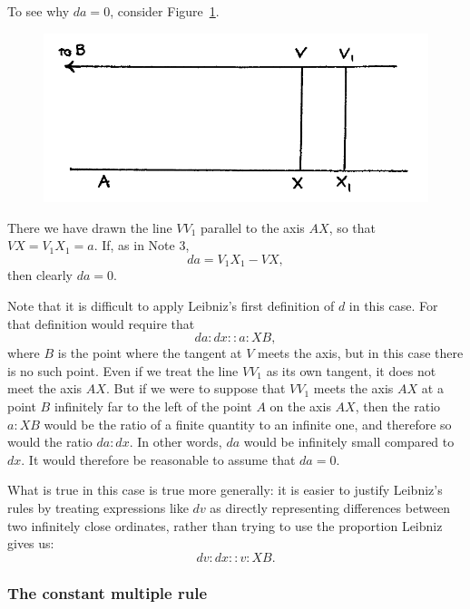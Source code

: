 \documentclass[twoside,openright]{article}
\begin{document}
To see why $da =0$, consider Figure~\ref{conrule}.
\begin{figure}[htp]
\begin{center}
\includegraphics[width=.75\textwidth]{fig/Figure12}
\caption{}
\label{conrule}
\vspace{-10pt}
\end{center}
\end{figure}
  There we have drawn the line $VV_1$ parallel to the axis $AX$, so that $VX =V_1X_1 = a$.   If, as in Note 3,
$$ da = V_1X_1 - VX,$$
then clearly $da =0$.

Note that it is difficult to apply Leibniz's first definition of $d$
in this case.  For that definition would require that
$$da \!:\! dx :: a \!:\! XB,$$ 
where $B$ is the point where the tangent at $V$ meets the axis, but in
this case there is no such point.  Even if we treat the line $VV_1$ as
its own tangent, it does not meet the axis $AX$.  But if we were to
suppose that $VV_1$ meets the axis $AX$ at a point $B$ infinitely far
to the left of the point $A$ on the axis $AX$, then the ratio
$a \!:\! XB$ would be the ratio of a finite quantity to an infinite
one, and therefore so would the ratio $da \!:\! dx.$ In other words,
$da$ would be infinitely small compared to $dx$.  It would therefore
be reasonable to assume that $da= 0$.


What is true in this case is true more generally: it is easier to
justify Leibniz's rules by treating expressions like $dv$ as directly
representing differences between two infinitely close ordinates,
rather than trying to use the proportion Leibniz gives us:
$$dv \!:\! dx :: v \!:\! XB.$$

\subsubsection*{The constant multiple rule}
\end{document}
